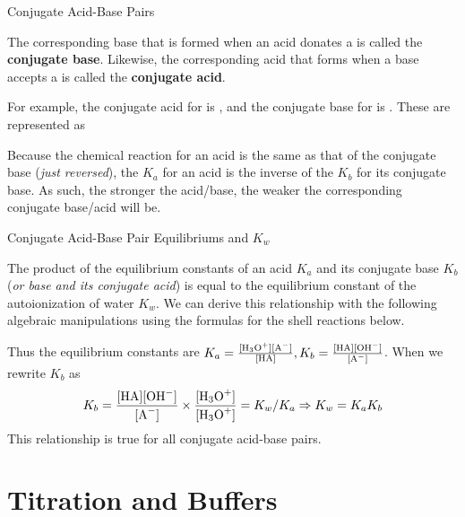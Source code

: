 \documentclass[10pt]{article}
\begin{document}
  \begin{core}{Conjugate Acid-Base Pairs}

    The corresponding base that is formed when an acid donates a  is called the \textbf{conjugate base}. Likewise, the corresponding acid that forms when a base accepts a  is called the \textbf{conjugate acid}.

    For example, the conjugate acid for  is , and the conjugate base for  is . These are represented as



    Because the chemical reaction for an acid is the same as that of the conjugate base (\textit{just reversed}), the $K_a$ for an acid is the inverse of the $K_b$ for its conjugate base. As such, the stronger the acid/base, the weaker the corresponding conjugate base/acid will be.  
    
  \end{core}

  \begin{core}{Conjugate Acid-Base Pair Equilibriums and $K_w$}

    The product of the equilibrium constants of an acid $K_a$ and its conjugate base $K_b$ (\textit{or base and its conjugate acid}) is equal to the equilibrium constant of the autoionization of water $K_w$. We can derive this relationship with the following algebraic manipulations using the formulas for the shell reactions below.



    Thus the equilibrium constants are $K_{a} = \frac{[\ce{H3O^+}][\ce{A-}]}{[\ce{HA}]} , K_{b} = \frac{[\ce{HA}][\ce{OH-}]}{[\ce{A-}]}$. When we rewrite $K_b$ as
    \[
      K_{b} = \frac{[\ce{HA}][\ce{OH-}]}{[\ce{A-}]} \times \frac{[\ce{H3O+}]}{[\ce{H3O+}]} = K_w/K_a \Rightarrow K_w = K_a K_b
    \]
    This relationship is true for all conjugate acid-base pairs. 
     
  \end{core}

\section{Titration and Buffers}
\end{document}

